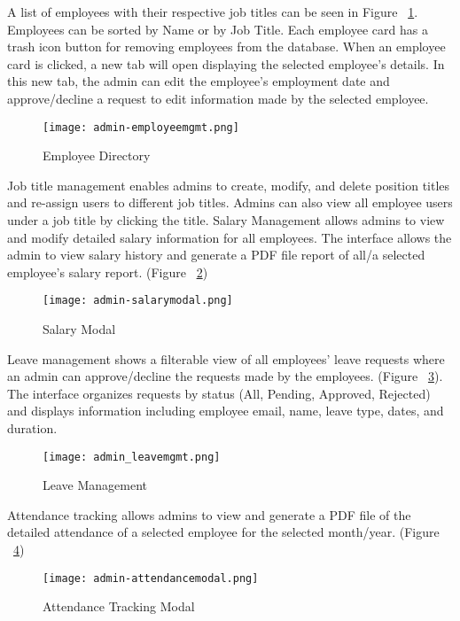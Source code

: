 \documentclass{icsthesis}
\begin{document}
\begin{mainmatter}
A list of employees with their respective job titles can be seen in Figure ~\ref{fig:ed}. Employees can be sorted by Name or by Job Title. Each employee card has a trash icon button for removing employees from the database. When an employee card is clicked, a new tab will open displaying the selected employee's details. In this new tab, the admin can edit the employee's employment date and approve/decline a request to edit information made by the selected employee.
    \begin{figure}[H]
        \centering
        \texttt{[image: admin-employeemgmt.png]}
        \caption{Employee Directory}
        \label{fig:ed}
    \end{figure}

Job title management enables admins to create, modify, and delete position titles and re-assign users to different job titles. Admins can also view all employee users under a job title by clicking the title. Salary Management allows admins to view and modify detailed salary information for all employees. The interface allows the admin to view salary history and generate a PDF file report of all/a selected employee's salary report. (Figure ~\ref{fig:ad-slrymdl})
\begin{figure}[H]
    \centering
    \texttt{[image: admin-salarymodal.png]}
    \caption{Salary Modal}
    \label{fig:ad-slrymdl}
\end{figure}

Leave management shows a filterable view of all employees' leave requests where an admin can approve/decline the requests made by the employees. (Figure ~\ref{fig:ad-leavemgmt}). The interface organizes requests by status (All, Pending, Approved, Rejected) and displays information including employee email, name, leave type, dates, and duration.

\begin{figure}[H]
    \centering
    \texttt{[image: admin\_leavemgmt.png]}
    \caption{Leave Management}
    \label{fig:ad-leavemgmt}
\end{figure}

Attendance tracking allows admins to view and generate a PDF file of the detailed attendance of a selected employee for the selected month/year. (Figure ~\ref{fig:ad-attndncemdl})
\begin{figure}[H]
    \centering
    \texttt{[image: admin-attendancemodal.png]}
    \caption{Attendance Tracking Modal}
    \label{fig:ad-attndncemdl}
\end{figure}


\end{mainmatter}
\end{document}
